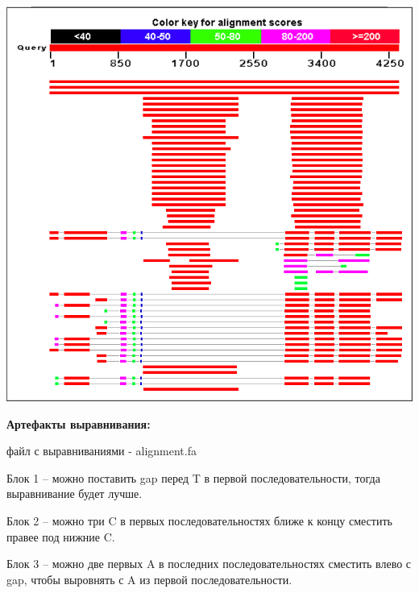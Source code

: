\documentclass{article} %
\begin{document}
\includegraphics[width=\textwidth]{blastn_align.png}

\textbf{Артефакты выравнивания:}

файл с выравниваниями - alignment.fa

Блок 1 – можно поставить gap перед T в первой последовательности, тогда
выравнивание будет лучше.

Блок 2 – можно три C в первых последовательностях ближе к концу сместить
правее под нижние C.

Блок 3 – можно две первых A в последних последовательностях сместить влево
с gap, чтобы выровнять с A из первой последовательности.
\end{document}
